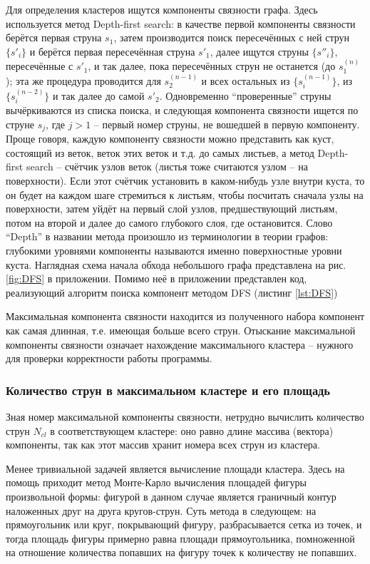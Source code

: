 Для определения кластеров ищутся компоненты связности графа. Здесь используется метод Depth-first search: в качестве первой компоненты связности берётся первая струна $s_1$, затем производится поиск пересечённых с ней струн $\{s'_i\}$ и берётся первая пересечённая струна $s'_1$, далее ищутся струны $\{s''_i\}$, пересечённые с $s'_1$, и так далее, пока пересечённых струн не останется (до $s^{(n)}_1$); эта же процедура проводится для $s^{(n-1)}_2$ и всех остальных из $\{s^{(n-1)}_i\}$, из $\{s^{(n-2)}_i\}$ и так далее до самой $s'_2$. Одновременно ``проверенные'' струны вычёркиваются из списка поиска, и следующая компонента связности ищется по струне $s_j$, где $j > 1$ -- первый номер струны, не вошедшей в первую компоненту. Проще говоря, каждую компоненту связности можно представить как куст, состоящий из веток, веток этих веток и т.д. до самых листьев, а метод Depth-first search -- счётчик узлов веток (листья тоже считаются узлом -- на поверхности). Если этот счётчик установить в каком-нибудь узле внутри куста, то он будет на каждом шаге стремиться к листьям, чтобы посчитать сначала узлы на поверхности, затем уйдёт на первый слой узлов, предшествующий листьям, потом на второй и далее до самого глубокого слоя, где остановится. Слово ``Depth'' в названии метода произошло из терминологии в теории графов: глубокими уровнями компоненты называются именно поверхностные уровни куста. Наглядная схема начала обхода небольшого графа представлена на рис. \ref{fig:DFS} в приложении. Помимо неё в приложении представлен код, реализующий алгоритм поиска компонент методом DFS (листинг \ref{lst:DFS})

Максимальная компонента связности находится из полученного набора компонент как самая длинная, т.е. имеющая больше всего струн. Отыскание максимальной компоненты связности означает нахождение максимального кластера -- нужного для проверки корректности работы программы.
\subsubsection{Количество струн в максимальном кластере и его площадь}
Зная номер максимальной компоненты связности, нетрудно вычислить количество струн $N_{cl}$ в соответствующем кластере: оно равно длине массива (вектора) компоненты, так как этот массив хранит номера всех струн из кластера. 

Менее тривиальной задачей является вычисление площади кластера. Здесь на помощь приходит метод Монте-Карло вычисления площадей фигуры произвольной формы: фигурой в данном случае является граничный контур наложенных друг на друга кругов-струн. Суть метода в следующем: на прямоугольник или круг, покрывающий фигуру, разбрасывается сетка из точек, и тогда площадь фигуры примерно равна площади прямоугольника, помноженной на отношение количества попавших на фигуру точек к количеству не попавших.
